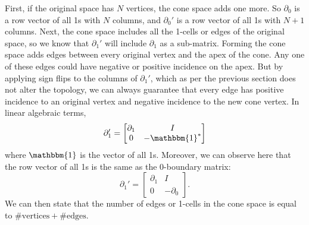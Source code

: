 \documentclass[twocolumn,leqno,twocolumn]{article}
\begin{document}
First, if the original space has $N$ vertices, the cone space adds one more.
So $\partial_0$ is a row vector of all 1s with $N$ columns, and $\partial_0'$ is a row vector of all 1s with $N + 1$ columns.
Next, the cone space includes all the 1-cells or edges of the original space, so we know that $\partial_1'$ will include $\partial_1$ as a sub-matrix.
Forming the cone space adds edges between every original vertex and the apex of the cone.
Any one of these edges could have negative or positive incidence on the apex.
But by applying sign flips to the columns of $\partial_1'$, which as per the previous section does not alter the topology, we can always guarantee that every edge has positive incidence to an original vertex and negative incidence to the new cone vertex.
In linear algebraic terms,
\begin{equation}
    \partial_1' = \left[\begin{matrix}\partial_1 & I \\ 0 & -\mathbbm{1}^*\end{matrix}\right]
\end{equation}
where $\mathbbm{1}$ is the vector of all 1s.
Moreover, we can observe here that the row vector of all 1s is the same as the 0-boundary matrix:
\begin{equation}
    \partial_1' = \left[\begin{matrix}\partial_1 & I \\ 0 & -\partial_0\end{matrix}\right].
    \label{eq:cone-partial1}
\end{equation}
We can then state that the number of edges or 1-cells in the cone space is equal to $\#\text{vertices} + \#\text{edges}$.
\end{document}
